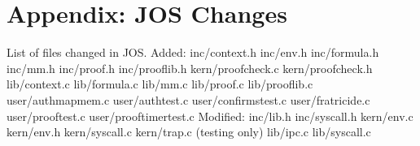 \documentclass[10pt]{article}
\begin{document}
\section{Appendix: JOS Changes}
List of files changed in JOS. \newline
\newline
Added:\newline
inc/context.h \newline
inc/env.h \newline
inc/formula.h \newline
inc/mm.h \newline
inc/proof.h \newline
inc/prooflib.h \newline
kern/proofcheck.c \newline
kern/proofcheck.h \newline
lib/context.c \newline
lib/formula.c \newline
lib/mm.c \newline
lib/proof.c \newline
lib/prooflib.c \newline
user/authmapmem.c \newline
user/authtest.c \newline
user/confirmstest.c \newline
user/fratricide.c \newline
user/prooftest.c \newline
user/prooftimertest.c \newline
\newline
Modified: \newline
inc/lib.h \newline
inc/syscall.h \newline
kern/env.c \newline
kern/env.h \newline
kern/syscall.c \newline
kern/trap.c (testing only) \newline
lib/ipc.c \newline
lib/syscall.c \newline



\end{document}
